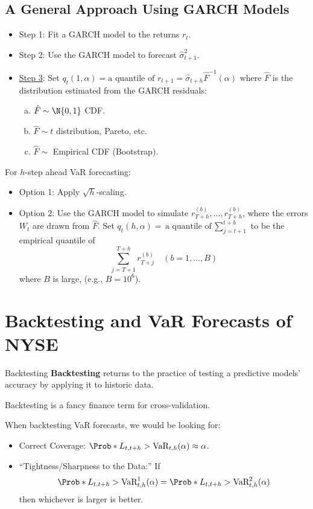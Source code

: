 \subsection*{A General Approach Using GARCH Models}
\begin{itemize}
    \item Step 1: Fit a GARCH model to the returns $ r_t $.
    \item Step 2: Use the GARCH model to forecast $ \hat{\sigma}_{t+1}^2 $.
    \item \underline{Step 3}: Set $ q_t(1,\alpha)=\text{a quantile of $r_{t+1}$}=\hat{\sigma}_{t+h}\hat{F}^{-1}(\alpha) $
          where $ \hat{F} $ is the distribution estimated from the GARCH residuals:
          \begin{enumerate}[(a)]
              \item $ \hat{F}\sim \N{0,1} $ CDF\@.
              \item $ \hat{F}\sim t $ distribution, Pareto, etc.
              \item $ \hat{F}\sim $ Empirical CDF (Bootstrap)\@.
          \end{enumerate}
\end{itemize}
For $ h $-step ahead VaR forecasting:
\begin{itemize}
    \item Option 1: Apply $ \sqrt{h} $-scaling.
    \item Option 2: Use the GARCH model to simulate $ r_{T+h}^{(b)},\ldots,r_{T+h}^{(b)} $,
          where the errors $ W_t $ are drawn from $ \hat{F} $. Set $ q_t(h,\alpha)=\text{a quantile of $\sum_{j=t+1}^{t+h} $}$
          to be the empirical quantile of
          \[ \sum_{j=T+1}^{T+h} r_{T+j}^{(b)}\quad(b=1,\ldots,B) \]
          where $ B $ is large, (e.g., $B=10^{6} $).
\end{itemize}
\section{Backtesting and VaR Forecasts of NYSE}
\begin{Definition}{Backtesting}{}
    \textbf{Backtesting} returns to the practice of testing a predictive
    models' accuracy by applying it to historic data.
\end{Definition}
\begin{Remark}{}{}
    Backtesting is a fancy finance term for cross-validation.
\end{Remark}
When backtesting VaR forecasts, we would be looking for:
\begin{itemize}
    \item Correct Coverage: $ \Prob*{L_{t,t+h}>\text{VaR}_{t,h}(\alpha)}\approx \alpha $.
    \item ``Tightness/Sharpness to the Data:'' If
          \[ \Prob*{L_{t,t+h}>\text{VaR}^1_{t,h}(\alpha)}=\Prob*{L_{t,t+h}>\text{VaR}^2_{t,h}(\alpha)} \]
          then whichever is larger is better.
\end{itemize}
